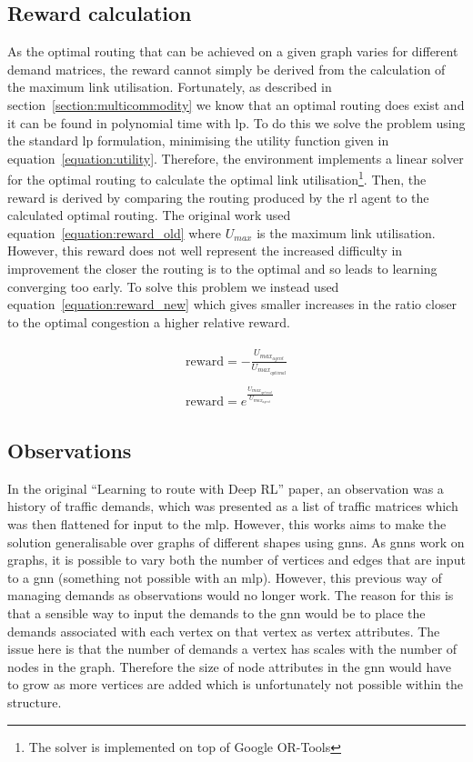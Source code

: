 \subsection{Reward calculation}
As the optimal routing that can be achieved on a given graph varies for different demand matrices, the reward cannot simply be derived from the calculation of the maximum link utilisation. Fortunately, as described in section~\ref{section:multicommodity} we know that an optimal routing does exist and it can be found in polynomial time with \ac{lp}. To do this we solve the problem using the standard \ac{lp} formulation, minimising the utility function given in equation~\ref{equation:utility}. Therefore, the environment implements a linear solver for the optimal routing to calculate the optimal link utilisation\footnote{The solver is implemented on top of Google OR-Tools\cite{ortools}}. Then, the reward is derived by comparing the routing produced by the \ac{rl} agent to the calculated optimal routing. The original work used equation~\ref{equation:reward_old} where $U_{max}$ is the maximum link utilisation. However, this reward does not well represent the increased difficulty in improvement the closer the routing is to the optimal and so leads to learning converging too early. To solve this problem we instead used equation~\ref{equation:reward_new} which gives smaller increases in the ratio closer to the optimal congestion a higher relative reward.

\begin{align}
  \begin{split}
    \label{equation:reward_old}
    \mathrm{reward} = -\frac{U_{max_{agent}}}{U_{max_{optimal}}}
  \end{split}\\
  \begin{split}
    \label{equation:reward_new}
    \mathrm{reward} = e^{\frac{U_{max_{optimal}}}{U_{max_{agent}}}}
  \end{split}
\end{align}


\subsection{Observations}
In the original ``Learning to route with Deep RL'' paper, an observation was a history of traffic demands, which was presented as a list of traffic matrices which was then flattened for input to the \ac{mlp}. However, this works aims to make the solution generalisable over graphs of different shapes using \acp{gnn}. As \acp{gnn} work on graphs, it is possible to vary both the number of vertices and edges that are input to a \ac{gnn} (something not possible with an \ac{mlp}). However, this previous way of managing demands as observations would no longer work. The reason for this is that a sensible way to input the demands to the \ac{gnn} would be to place the demands associated with each vertex on that vertex as vertex attributes. The issue here is that the number of demands a vertex has scales with the number of nodes in the graph. Therefore the size of node attributes in the \ac{gnn} would have to grow as more vertices are added which is unfortunately not possible within the structure.

